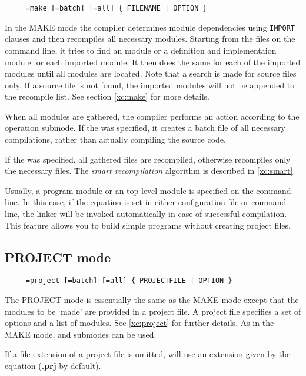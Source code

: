\verb'    '\xc{}\verb' =make [=batch] [=all] { FILENAME | OPTION }'

In the MAKE mode the compiler determines module dependencies using
\verb'IMPORT' clauses and then recompiles all necessary modules.
Starting from the files on the command line, it tries to find an \ot{}
module or a definition and implementaion module for each imported
module. It then does the same for each of the imported modules until
all modules are located. Note that a search is made for source files
only. If a source file is not found, the imported modules will not be
appended to the recompile list. See section \ref{xc:make} for more details.

When all modules are gathered, the compiler performs an action according to
the operation submode. If the  was specified, it
creates a batch file of all necessary compilations, rather than
actually compiling the source code.

If the  was specified, all gathered files are
recompiled, otherwise \xds{} recompiles only the necessary files.
The {\em smart recompilation} algorithm is described in
\ref{xc:smart}.

Usually, a \mt{} program module or an \ot{} top-level module
is specified on the command line. In this case, if the  equation
is set in either configuration file or \xc{} command line,
the linker will be invoked automatically in case of successful
compilation. This feature allows you to build simple programs without
creating project files.

\subsection{PROJECT mode}\label{xc:modes:project}

\verb'    '\xc{}\verb' =project [=batch] [=all] { PROJECTFILE | OPTION }'

The PROJECT mode is essentially the same as the MAKE mode except that the
modules to be `made' are provided in a project file. A project
file specifies a set of options and a list of modules.
See \ref{xc:project} for further details.
As in the MAKE mode,  and 
submodes can be used.

If a file extension of a project file is omitted, \xds{} will use
an extension given by the equation 
({\bf .prj} by default). 

